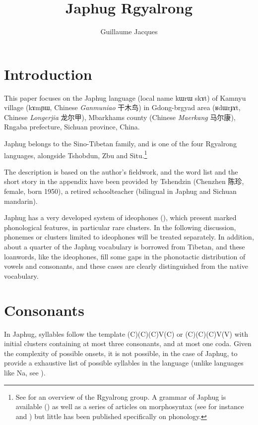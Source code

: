 \documentclass[oldfontcommands,oneside,a4paper,11pt]{article}
\newcommand{\ipa}[1]{{\phon #1}} %
\newcommand{\zh}[1]{{\cn #1}}
\begin{document}
 

\title{Japhug Rgyalrong}
\author{Guillaume Jacques}
\maketitle
\linenumbers
 \section{Introduction}
 This paper focuses on the Japhug language (local name \ipa{kɯrɯ skɤt}) of Kamnyu village (\ipa{kɤmɲɯ}, Chinese \textit{Ganmuniao} \zh{干木鸟}) in Gdong-brgyad area (\ipa{ʁdɯrɟɤt}, Chinese  \textit{Longerjia} \zh{龙尔甲}), Mbarkhams county (Chinese \textit{Maerkang} \zh{马尔康}), Rngaba prefecture, Sichuan province, China.
 
 Japhug belongs to the Sino-Tibetan family, and is one of the four Rgyalrong languages, alongside Tshobdun, Zbu and Situ.\footnote{See  \citet{jackson00sidaba} for an overview of the Rgyalrong group. A grammar of Japhug is available (\citealt{jacques08}) as well as a series of articles on morphosyntax (see for instance  \citealt{jacques13harmonization} and
 \citealt{jacques14antipassive}) but little has been published specifically on phonology. } 
 
The description is based on the author’s fieldwork, and the word list and the short story in the appendix have been provided by Tshendzin (Chenzhen \zh{陈珍}, female, born 1950), a retired schoolteacher (bilingual in Japhug and Sichuan mandarin).

 Japhug has a very developed system of ideophones (\citealt{japhug14ideophones}), which present marked phonological features, in particular rare clusters. In the following discussion, phonemes or clusters limited to ideophones will be treated separately. In addition, about a quarter of the Japhug vocabulary is borrowed from Tibetan, and these loanwords, like the ideophones, fill some gaps in the phonotactic distribution of vowels and consonants, and these cases are clearly distinguished from the native vocabulary.

 
 \section{Consonants}
 In Japhug, syllables follow the template (C)(C)(C)V(C) or (C)(C)(C)V(V) with initial clusters containing at most three consonants, and at most one coda. Given the complexity of possible onsets, it is not possible, in the case of Japhug, to provide a exhaustive list of possible syllables in the language (unlike languages like Na, see \citealt{michaud08yn}).
 
\end{document}
